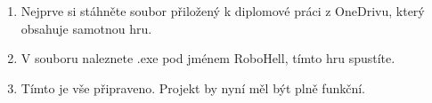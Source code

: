 \begin{enumerate}
\item Nejprve si stáhněte soubor přiložený k diplomové práci z OneDrivu, který obsahuje samotnou hru.
\item V souboru naleznete .exe pod jménem RoboHell, tímto hru spustíte.
\item Tímto je vše připraveno. Projekt by nyní měl být plně funkční.
\end{enumerate}